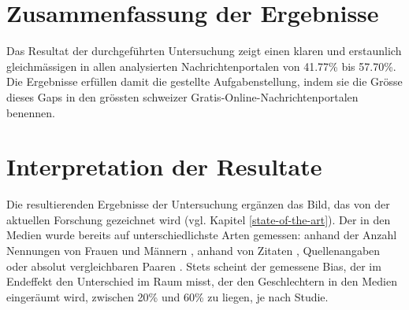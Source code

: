 
 

\section {Zusammenfassung der Ergebnisse}



Das Resultat der durchgeführten Untersuchung zeigt einen klaren und erstaunlich
gleichmässigen  in allen analysierten Nachrichtenportalen von
41.77\% bis 57.70\%. Die Ergebnisse erfüllen damit die gestellte Aufgabenstellung, indem sie
die Grösse dieses Gaps in den grössten schweizer Gratis-Online-Nachrichtenportalen
benennen.

\section {Interpretation der Resultate}\label{interpretation}




Die resultierenden Ergebnisse der Untersuchung ergänzen das Bild, das von der aktuellen Forschung
gezeichnet wird (vgl. Kapitel \ref{state-of-the-art}). Der  in den Medien wurde bereits auf unterschiedlichste
Arten gemessen: anhand der Anzahl Nennungen von Frauen und Männern \cite{does-gender-matter-in-the-news},
anhand von Zitaten \cite{gender_gap_tracker}, Quellenangaben \cite{citation-network} oder absolut
vergleichbaren Paaren \cite{gender_bias_in_media}. Stets scheint der gemessene Bias, der im Endeffekt
den Unterschied im Raum misst, der den Geschlechtern in den Medien eingeräumt wird, zwischen 20\%
und 60\% zu liegen, je nach Studie.

